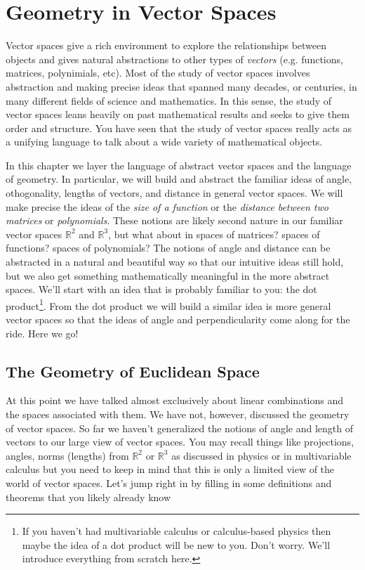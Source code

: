 \chapter{Geometry in Vector Spaces}
Vector spaces give a rich environment to explore the relationships between 
objects and gives natural abstractions to other types of {\it vectors} (e.g. functions,
matrices, polynimials, etc).  Most of the study of vector spaces involves abstraction
and making precise ideas that spanned many decades, or centuries, in many different fields
of science and mathematics.  In this sense, the study of vector spaces leans heavily on
past mathematical results and seeks to give them order and structure.  You
have seen that the study of vector spaces really acts as a unifying language to talk about
a wide variety of mathematical objects.

In this chapter we layer the language of abstract vector spaces and the language of
geometry.  In particular, we will build and abstract the familiar ideas of angle,
othogonality, lengths of vectors, and distance in general vector spaces.  We will make
precise the ideas of the {\it size of a function} or the {\it distance between two
matrices} or {\it polynomials}.  These notions are likely second nature in our familiar
vector spaces 
$\mathbb{R}^2$ and $\mathbb{R}^3$, but what about in spaces of matrices? spaces of
functions? spaces of polynomials?  The notions of angle and  distance can be abstracted in
a natural and beautiful way so that our intuitive ideas still hold, but we also get
something mathematically meaningful in the more abstract spaces.  We'll start with an idea
that is probably familiar to you: the dot product\footnote{If you haven't had
multivariable calculus or calculus-based physics then maybe the idea of a dot product will
be new to you.  Don't worry.  We'll introduce everything from scratch here.}.  From the
dot product we will build a similar idea is more general vector spaces so that the ideas
of angle and perpendicularity come along for the ride.  Here we go!

\section{The Geometry of Euclidean Space}
At this point we have talked almost exclusively about linear combinations and the spaces
associated with them.  We have not, however, discussed the geometry of vector spaces.  So
far we haven't generalized the notions of angle and length of vectors to our large view of
vector spaces.  You may recall things like projections, angles, norms (lengths) from
$\mathbb{R}^2$ or $\mathbb{R}^3$ as discussed in physics or in multivariable calculus but
you need to keep in mind that this is only a limited view of the world of vector spaces.
Let's jump right in by filling in some definitions and theorems that you likely already
know

